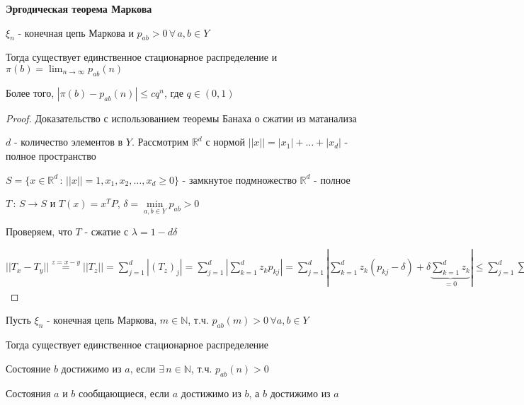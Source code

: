 \begin{theorem}
    \textbf{Эргодическая теорема Маркова}

    $\xi_n$ - конечная цепь Маркова и $p_{ab} > 0 \, \forall \, a, b \in Y$

    Тогда существует единственное стационарное распределение и $\pi (b) = \lim_{n \to \infty} p_{ab} (n)$

    Более того, $|\pi (b) - p_{ab} (n) | \leqslant cq^n $, где $q \in (0, 1)$
\end{theorem}

\begin{proof}
    Доказательство с использованием теоремы Банаха о сжатии из матанализа

    $d$ - количество элементов в $Y$. Рассмотрим $\mathbb{R}^d$ с нормой $||x|| = |x_1| + \ldots + |x_d|$ - полное пространство

    $S = \{ x \in \mathbb{R}^d \, : \, ||x|| = 1, x_1, x_2, \ldots, x_d \geqslant 0 \}$ - замкнутое подмножество $\mathbb{R}^d$ - полное

    $T \, : \, S \to S$ и $T(x) = x^{T} P$, $\delta = \min\limits_{a, b \in Y} p_{ab} > 0$

    Проверяем, что $T$ - сжатие с $\lambda = 1 - d\delta$

    $||T_x - T_y|| \overset{z = x - y}{=} ||T_z|| = \sum\limits_{j = 1}^d |(T_z)_j| = \sum\limits_{j = 1}^d \left | \sum\limits_{k = 1}^d z_k p_{kj} \right | = 
    \sum\limits_{j = 1}^d \left | \sum\limits_{k = 1}^d z_k (p_{kj} - \delta) + \delta \underbrace{\sum\limits_{k = 1}^d z_k}_{= 0} \right | \leqslant \sum\limits_{j = 1}^d \sum\limits_{k = 1}^d |z_k| (p_{kj} - \delta) = 
    \sum\limits_{k = 1}^d |z_k| \sum\limits_{j = 1}^d \underbrace{(p_{kj} - \delta)}_{=1 - \delta d = \lambda} = \lambda \sum\limits_{k = 1}^d |z_k| = \lambda ||x - y|| $
\end{proof}

\begin{remark}
    Пусть $\xi_n$ - конечная цепь Маркова, $m \in \mathbb{N}$, т.ч. $p_{ab} (m) > 0 \, \forall a, b \in Y$

    Тогда существует единственное стационарное распределение
\end{remark}

\begin{definition}
    Состояние $b$ достижимо из $a$, если $\exists \, n \in \mathbb{N}$, т.ч. $p_{ab} (n) > 0$
\end{definition}

\begin{definition}
    Состояния $a$ и $b$ сообщающиеся, если $a$ достижимо из $b$, а $b$ достижимо из $a$
\end{definition}

